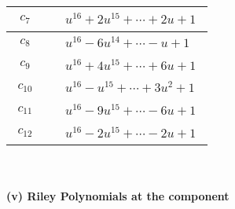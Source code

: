 \documentclass[1p]{elsarticle_modified}
\theoremstyle{definition}
\begin{document}
\begin{tabular}{m{50pt}|m{274pt}}
\hline $$\begin{aligned}c_{7}\end{aligned}$$&$\begin{aligned}
&u^{16}+2 u^{15}+\cdots+2 u+1
\end{aligned}$\\
\hline $$\begin{aligned}c_{8}\end{aligned}$$&$\begin{aligned}
&u^{16}-6 u^{14}+\cdots- u+1
\end{aligned}$\\
\hline $$\begin{aligned}c_{9}\end{aligned}$$&$\begin{aligned}
&u^{16}+4 u^{15}+\cdots+6 u+1
\end{aligned}$\\
\hline $$\begin{aligned}c_{10}\end{aligned}$$&$\begin{aligned}
&u^{16}- u^{15}+\cdots+3 u^2+1
\end{aligned}$\\
\hline $$\begin{aligned}c_{11}\end{aligned}$$&$\begin{aligned}
&u^{16}-9 u^{15}+\cdots-6 u+1
\end{aligned}$\\
\hline $$\begin{aligned}c_{12}\end{aligned}$$&$\begin{aligned}
&u^{16}-2 u^{15}+\cdots-2 u+1
\end{aligned}$\\
\hline
\end{tabular}\\~\\
\newpage\renewcommand{\arraystretch}{1}
\flushleft \textbf{(v) Riley Polynomials at the component}\newline \\
\end{document}
